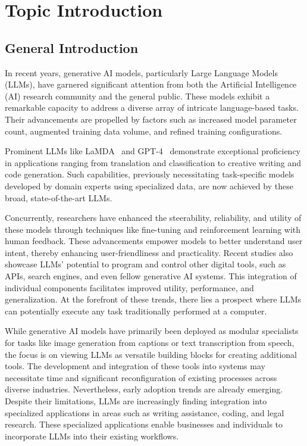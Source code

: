 \documentclass[a4paper,oneside]{book}
\begin{document}
\newpage
\tableofcontents

\newpage
\listoffigures

\newpage
\listoftables

\newpage
\chapter{Topic Introduction}

\section{General Introduction}
In recent years, generative AI models, particularly Large Language Models (LLMs), have garnered significant attention from both the Artificial Intelligence (AI) research community and the general public. These models exhibit a remarkable capacity to address a diverse array of intricate language-based tasks. Their advancements are propelled by factors such as increased model parameter count, augmented training data volume, and refined training configurations.

Prominent LLMs like LaMDA~\cite{thoppilan2022lamda} and GPT-4~\cite{achiam2023gpt} demonstrate exceptional proficiency in applications ranging from translation and classification to creative writing and code generation. Such capabilities, previously necessitating task-specific models developed by domain experts using specialized data, are now achieved by these broad, state-of-the-art LLMs.

Concurrently, researchers have enhanced the steerability, reliability, and utility of these models through techniques like fine-tuning and reinforcement learning with human feedback. These advancements empower models to better understand user intent, thereby enhancing user-friendliness and practicality. Recent studies also showcase LLMs' potential to program and control other digital tools, such as APIs, search engines, and even fellow generative AI systems. This integration of individual components facilitates improved utility, performance, and generalization. At the forefront of these trends, there lies a prospect where LLMs can potentially execute any task traditionally performed at a computer.

While generative AI models have primarily been deployed as modular specialists for tasks like image generation from captions or text transcription from speech, the focus is on viewing LLMs as versatile building blocks for creating additional tools. The development and integration of these tools into systems may necessitate time and significant reconfiguration of existing processes across diverse industries. Nevertheless, early adoption trends are already emerging. Despite their limitations, LLMs are increasingly finding integration into specialized applications in areas such as writing assistance, coding, and legal research. These specialized applications enable businesses and individuals to incorporate LLMs into their existing workflows.
\end{document}
